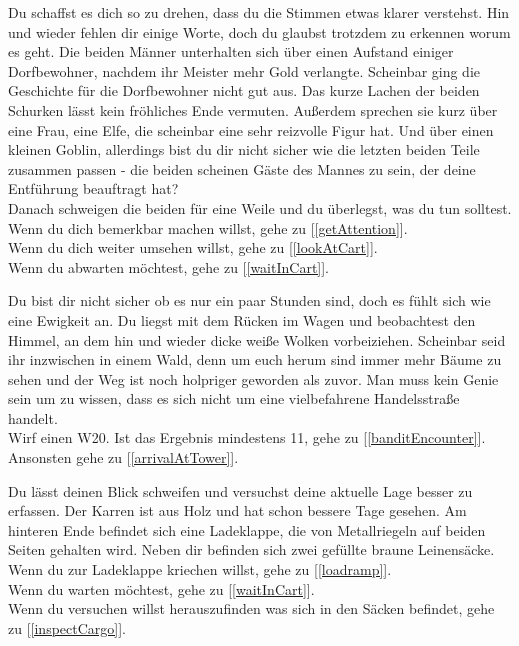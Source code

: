 Du schaffst es dich so zu drehen, dass du die Stimmen etwas klarer verstehst. Hin und wieder fehlen dir einige Worte, doch du glaubst trotzdem zu erkennen worum es geht. Die beiden Männer unterhalten sich über einen Aufstand einiger Dorfbewohner, nachdem ihr Meister mehr Gold verlangte. Scheinbar ging die Geschichte für die Dorfbewohner nicht gut aus. Das kurze Lachen der beiden Schurken lässt kein fröhliches Ende vermuten. Außerdem sprechen sie kurz über eine Frau, eine Elfe, die scheinbar eine sehr reizvolle Figur hat. Und über einen kleinen Goblin, allerdings bist du dir nicht sicher wie die letzten beiden Teile zusammen passen - die beiden scheinen Gäste des Mannes zu sein, der deine Entführung beauftragt hat?\\
Danach schweigen die beiden für eine Weile und du überlegst, was du tun solltest.
\\Wenn du dich bemerkbar machen willst, gehe zu [\ref{getAttention}].
\\Wenn du dich weiter umsehen willst, gehe zu [\ref{lookAtCart}].
\\Wenn du abwarten möchtest, gehe zu [\ref{waitInCart}].


Du bist dir nicht sicher ob es nur ein paar Stunden sind, doch es fühlt sich wie eine Ewigkeit an. Du liegst mit dem Rücken im Wagen und beobachtest den Himmel, an dem hin und wieder dicke weiße Wolken vorbeiziehen. Scheinbar seid ihr inzwischen in einem Wald, denn um euch herum sind immer mehr Bäume zu sehen und der Weg ist noch holpriger geworden als zuvor. Man muss kein Genie sein um zu wissen, dass es sich nicht um eine vielbefahrene Handelsstraße handelt.\\
Wirf einen W20. Ist das Ergebnis mindestens 11, gehe zu [\ref{banditEncounter}].\\
Ansonsten gehe zu [\ref{arrivalAtTower}].


Du lässt deinen Blick schweifen und versuchst deine aktuelle Lage besser zu erfassen. Der Karren ist aus Holz und hat schon bessere Tage gesehen. Am hinteren Ende befindet sich eine Ladeklappe, die von Metallriegeln auf beiden Seiten gehalten wird. Neben dir befinden sich zwei gefüllte braune Leinensäcke.
\\Wenn du zur Ladeklappe kriechen willst, gehe zu [\ref{loadramp}].
\\Wenn du warten möchtest, gehe zu [\ref{waitInCart}].
\\Wenn du versuchen willst herauszufinden was sich in den Säcken befindet, gehe zu [\ref{inspectCargo}].


